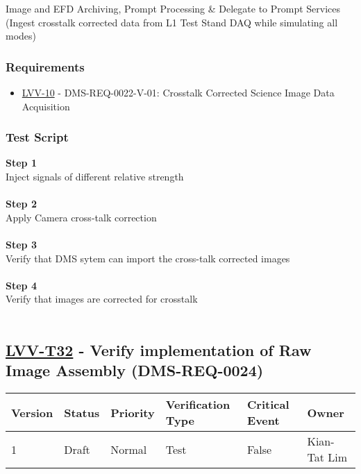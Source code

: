 Image and EFD Archiving, Prompt Processing \& Delegate to Prompt
Services (Ingest crosstalk corrected data from L1 Test Stand DAQ while
simulating all modes)

\hypertarget{requirements-121}{%
\subsubsection{Requirements}\label{requirements-121}}

\begin{itemize}
\tightlist
\item
  \href{https://jira.lsstcorp.org/browse/LVV-10}{LVV-10} -
  DMS-REQ-0022-V-01: Crosstalk Corrected Science Image Data Acquisition
\end{itemize}

\hypertarget{test-script-121}{%
\subsubsection{Test Script}\label{test-script-121}}

\textbf{Step 1}\\
Inject signals of different relative strength\\
~\\
\textbf{Step 2}\\
Apply Camera cross-talk correction\\
~\\
\textbf{Step 3}\\
Verify that DMS sytem can import the cross-talk corrected images\\
~\\
\textbf{Step 4}\\
Verify that images are corrected for crosstalk\\
~\\

\hypertarget{lvv-t32---verify-implementation-of-raw-image-assembly-dms-req-0024}{%
\subsection{\texorpdfstring{\href{https://jira.lsstcorp.org/secure/Tests.jspa\#/testCase/LVV-T32}{LVV-T32}
- Verify implementation of Raw Image Assembly
(DMS-REQ-0024)}{LVV-T32 - Verify implementation of Raw Image Assembly (DMS-REQ-0024)}}\label{lvv-t32---verify-implementation-of-raw-image-assembly-dms-req-0024}}

\begin{longtable}[]{@{}llllll@{}}
\toprule
Version & Status & Priority & Verification Type & Critical Event &
Owner\tabularnewline
\midrule
\endhead
1 & Draft & Normal & Test & False & Kian-Tat Lim\tabularnewline
\bottomrule
\end{longtable}

